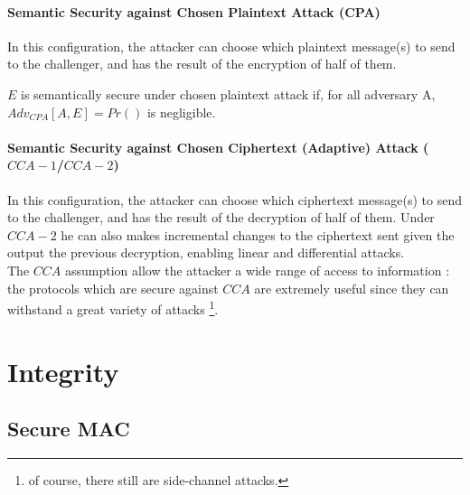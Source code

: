 \paragraph{Semantic Security against Chosen Plaintext Attack (CPA)\\}

In this configuration, the attacker can choose which plaintext message(s) to send to the challenger, and has the result of the encryption of half of them. 

\begin{mytheorem}
    $E$ is semantically secure  under chosen plaintext attack if, for all adversary A, $Adv_{CPA}[A,E] = Pr()$ is negligible.
\end{mytheorem}

\paragraph{Semantic Security against Chosen Ciphertext (Adaptive) Attack ($CCA-1$/$CCA-2$)\\}

In this configuration, the attacker can choose which ciphertext message(s) to send to the challenger, and has the result of the decryption of half of them. Under $CCA-2$ he can also makes incremental changes to the ciphertext sent given the output the previous decryption, enabling linear and differential attacks. \\
The $CCA$ assumption allow the attacker a wide range of access to information : the protocols which are secure against $CCA$ are extremely useful since they can withstand a great variety of attacks \footnote{of course, there still are side-channel attacks.}.

\section{Integrity}
\subsection{Secure MAC}


